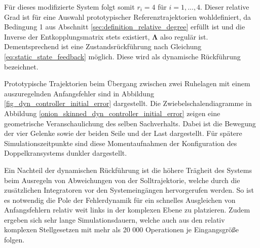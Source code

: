 Für dieses modifizierte System folgt somit $r_i = 4$ für $i = 1, ..., 4$. Dieser relative Grad ist für eine Auswahl prototypischer Referenztrajektorien wohldefiniert, da Bedingung 1 aus Abschnitt \ref{sec:definition_relative_degree} erfüllt ist und die Inverse der Entkopplungsmatrix stets existiert, $\boldsymbol{\Lambda}$ also regulär ist. Dementsprechend ist eine Zustandsrückführung nach Gleichung \eqref{eq:static_state_feedback} möglich. Diese wird als dynamische Rückführung bezeichnet. 

Prototypische Trajektorien beim Übergang zwischen zwei Ruhelagen mit einem auszuregelnden Anfangsfehler sind in Abbildung \ref{fig_dyn_controller_initial_error} dargestellt. Die Zwiebelschalendiagramme in Abbildung \ref{onion_skinned_dyn_controller_initial_error} zeigen eine geometrische Veranschaulichung des selben Sachverhalts. Dabei ist die Bewegung der vier Gelenke sowie der beiden Seile und der Last dargestellt. Für spätere Simulationszeitpunkte sind diese Momentaufnahmen der Konfiguration des Doppelkransystems dunkler dargestellt.

Ein Nachteil der dynamischen Rückführung ist die höhere Trägheit des Systems beim Ausregeln von Abweichungen von der Solltrajektorie, welche durch die zusätzlichen Integratoren vor den Systemeingängen hervorgerufen werden. So ist es notwendig die Pole der Fehlerdynamik für ein schnelles Ausgleichen von Anfangsfehlern relativ weit links in der komplexen Ebene zu platzieren. Zudem ergeben sich sehr lange Simulationsdauern, welche auch aus den relativ komplexen Stellgesetzen mit mehr als 20 000 Operationen je Eingangsgröße folgen. 

